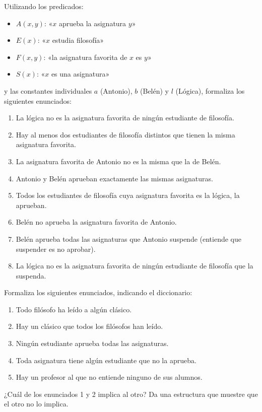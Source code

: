 \begin{pregunta}\label{e5-3}
Utilizando los predicados:
\begin{itemize}
    \item $A(x, y)$: «$x$ aprueba la asignatura $y$»
    \item $E(x)$: «$x$ estudia filosofía»
    \item $F(x, y)$: «la asignatura favorita de $x$ es $y$»
    \item $S(x)$: «$x$ es una asignatura»
\end{itemize}
y las constantes individuales $a$ (Antonio), $b$ (Belén) y $l$ (Lógica), formaliza los siguientes enunciados:
\begin{enumerate}
    \item La lógica no es la asignatura favorita de ningún estudiante de filosofía.
    \item Hay al menos dos estudiantes de filosofía distintos que tienen la misma asignatura favorita.
    \item La asignatura favorita de Antonio no es la misma que la de Belén.
    \item Antonio y Belén aprueban exactamente las mismas asignaturas.
    \item Todos los estudiantes de filosofía cuya asignatura favorita es la lógica, la aprueban.
    \item Belén no aprueba la asignatura favorita de Antonio.
    \item Belén aprueba todas las asignaturas que Antonio suspende (entiende que suspender es no aprobar).
    \item La lógica no es la asignatura favorita de ningún estudiante de filosofía que la suspenda.
\end{enumerate}
\end{pregunta}

\begin{pregunta}\label{e5-anid}
Formaliza los siguientes enunciados, indicando el diccionario:
\begin{enumerate}
    \item Todo filósofo ha leído a algún clásico.
    \item Hay un clásico que todos los filósofos han leído.
    \item Ningún estudiante aprueba todas las asignaturas.
    \item Toda asignatura tiene algún estudiante que no la aprueba.
    \item Hay un profesor al que no entiende ninguno de sus alumnos.
\end{enumerate}
¿Cuál de los enunciados 1 y 2 implica al otro? Da una estructura que muestre que el otro no lo implica.
\end{pregunta}

